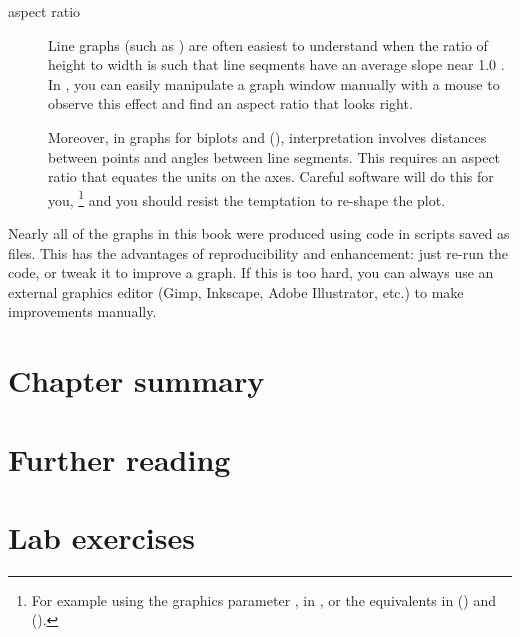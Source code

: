 \documentclass[11pt]{book}
\renewenvironment{knitrout}{\small\renewcommand{\baselinestretch}{.85}}{} %
\begin{document}
\begin{description}
 \item[aspect ratio] Line graphs (such as )
 are often easiest to understand when the ratio of
 height to width is such that line seqments have an average slope
 near 1.0 \citep{Cleveland-etal:88:shape}.
 In \R, you can easily manipulate a graph window manually with a
 mouse to observe this effect and find an aspect ratio that looks
 right.
 
 Moreover, in graphs for biplots and \ca (),
 interpretation involves distances between points and 
 angles between line segments. This requires an aspect ratio
 that equates the units on the axes.  Careful software will
 do this for you,%
 \footnote{
 For example using the graphics parameter ,
  in ,
 or the equivalents in  ()
 and  ().
 }
 and you should resist the temptation to re-shape the plot.
 
\end{description}

Nearly all of the graphs in this book were produced using \R code in
scripts saved as files.  This has the advantages of reproducibility
and enhancement: just re-run the code, or tweak it to improve a graph.
If this is too hard, you can always use an external graphics editor
(Gimp, Inkscape, Adobe Illustrator, etc.) to make improvements manually.

\section{Chapter summary}


\section{Further reading}\label{sec:ch01-reading}


\section{Lab exercises}\label{sec:ch01-exercises}


\begin{knitrout}\footnotesize
{}\color{fgcolor}\begin{kframe}
\begin{alltt}
\hlopt{$} \hlkwb{<-} \hlstd{(}
\hlopt{$}
\hlstd{(}\hlopt{$}\hlstd{ch01[}\hlopt{$}\hlstd{(}\hlstd{)\{}\hlopt{!}\hlstd{(}\hlstd{(n))\})])}
\end{alltt}
\end{kframe}
\end{knitrout}
\end{document}
